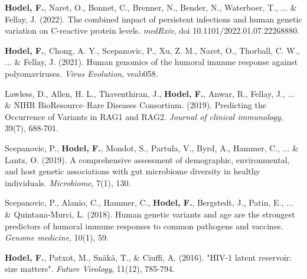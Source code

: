 \documentclass[10pt, a4paper, normalphoto]{altacv}
\begin{document}
\medskip
{}

\medskip

\medskip




\newpage
\begin{fullwidth} %

\item \textbf{Hodel, F.}, Naret, O., Bonnet, C., Brenner, N., Bender, N., Waterboer, T., ... \& Fellay, J. (2022). The combined impact of persistent infections and human genetic variation on C-reactive protein levels. {\itshape medRxiv}, doi 10.1101/2022.01.07.22268880.
\item \textbf{Hodel, F.}, Chong, A. Y., Scepanovic, P., Xu, Z. M., Naret, O., Thorball, C. W., ... \& Fellay, J. (2021). Human genomics of the humoral immune response against polyomaviruses. {\itshape Virus Evolution}, veab058.
\item Lawless, D., Allen, H. L., Thaventhiran, J., \textbf{Hodel, F.}, Anwar, R., Fellay, J., ... \& NIHR BioResource–Rare Diseases Consortium. (2019). Predicting the Occurrence of Variants in RAG1 and RAG2. {\itshape Journal of clinical immunology}, 39(7), 688-701.
\item Scepanovic, P., \textbf{Hodel, F.}, Mondot, S., Partula, V., Byrd, A., Hammer, C., ... \& Lantz, O. (2019). A comprehensive assessment of demographic, environmental, and host genetic associations with gut microbiome diversity in healthy individuals. {\itshape Microbiome}, 7(1), 130.
\item Scepanovic, P., Alanio, C., Hammer, C., \textbf{Hodel, F.}, Bergstedt, J., Patin, E., ... \& Quintana-Murci, L. (2018). Human genetic variants and age are the strongest predictors of humoral immune responses to common pathogens and vaccines. {\itshape Genome medicine}, 10(1), 59.
\item \textbf{Hodel, F.}, Patxot, M., Sn{\"a}k{\"a}, T., \& Ciuffi, A. (2016). "HIV-1 latent reservoir: size matters". {\itshape Future Virology}, 11(12), 785-794.


\end{fullwidth}
\end{document}
